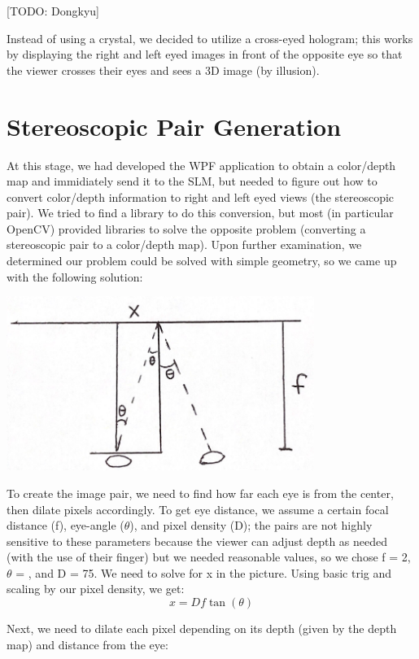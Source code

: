 \documentclass[12pt]{article}
\begin{document}
[TODO: Dongkyu]

Instead of using a crystal, we decided to utilize a cross-eyed hologram; this works by displaying the right and left eyed images in front of the opposite eye so that the viewer crosses their eyes and sees a 3D image (by illusion).

\section{Stereoscopic Pair Generation}

At this stage, we had developed the WPF application to obtain a color/depth map and immidiately send it to the SLM, but needed to figure out how to convert color/depth information to right and left eyed views (the stereoscopic pair). We tried to find a library to do this conversion, but most (in particular OpenCV) provided libraries to solve the opposite problem (converting a stereoscopic pair to a color/depth map). Upon further examination, we determined our problem could be solved with simple geometry, so we came up with the following solution:

\begin{center}
\includegraphics[width=100mm]{eye_disp_pic.png}
\end{center}

To create the image pair, we need to find how far each eye is from the center, then dilate pixels accordingly. To get eye distance, we assume a certain focal distance (f), eye-angle (\(\theta\)), and pixel density (D); the pairs are not highly sensitive to these parameters because the viewer can adjust depth as needed (with the use of their finger) but we needed reasonable values, so we chose f = 2, \(\theta\) = , and D = 75. We need to solve for x in the picture. Using basic trig and scaling by our pixel density, we get: \[x = Df\tan(\theta)\]

Next, we need to dilate each pixel depending on its depth (given by the depth map) and distance from the eye:
\end{document}
